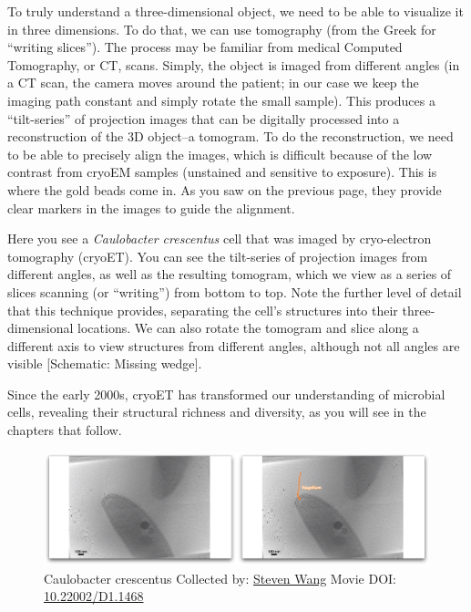 \documentclass[]{tufte-book}
\begin{document}
To truly understand a three-dimensional object, we need to be able to
visualize it in three dimensions. To do that, we can use tomography
(from the Greek for ``writing slices''). The process may be familiar
from medical Computed Tomography, or CT, scans. Simply, the object is
imaged from different angles (in a CT scan, the camera moves around the
patient; in our case we keep the imaging path constant and simply rotate
the small sample). This produces a ``tilt-series'' of projection images
that can be digitally processed into a reconstruction of the 3D
object--a tomogram. To do the reconstruction, we need to be able to
precisely align the images, which is difficult because of the low
contrast from cryoEM samples (unstained and sensitive to exposure). This
is where the gold beads come in. As you saw on the previous page, they
provide clear markers in the images to guide the alignment.

Here you see a \emph{Caulobacter crescentus} cell that was imaged by
cryo-electron tomography (cryoET). You can see the tilt-series of
projection images from different angles, as well as the resulting
tomogram, which we view as a series of slices scanning (or ``writing'')
from bottom to top. Note the further level of detail that this technique
provides, separating the cell's structures into their three-dimensional
locations. We can also rotate the tomogram and slice along a different
axis to view structures from different angles, although not all angles
are visible {[}Schematic: Missing wedge{]}.

Since the early 2000s, cryoET has transformed our understanding of
microbial cells, revealing their structural richness and diversity, as
you will see in the chapters that follow.





\begin{figure}
\includegraphics{movie_stills/1_6} \caption[Caulobacter crescentus Collected by:
\protect\hyperlink{steven_wang}{Steven Wang} Movie DOI:
\href{https://doi.org/10.22002/D1.1468}{10.22002/D1.1468}]{Caulobacter crescentus Collected by:
\protect\hyperlink{steven_wang}{Steven Wang} Movie DOI:
\href{https://doi.org/10.22002/D1.1468}{10.22002/D1.1468}}\label{fig:1-6}
\end{figure}
\end{document}
